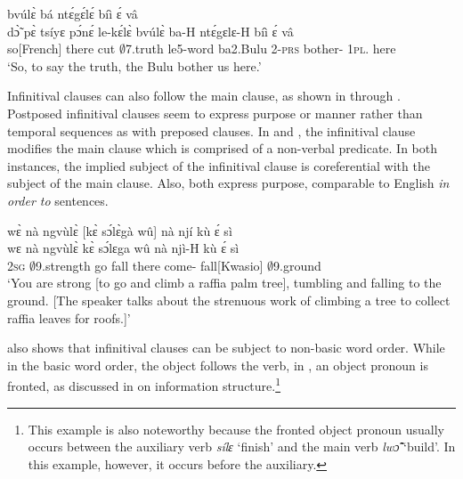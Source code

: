 \ea\label{INFpre6}
  \glll  [dɔ̃̀ pɛ̀ tsíyɛ̀ pɔ́nɛ́ lèkɛ́lɛ̀]\textsubscript{{\SUB}} bvúlɛ̀ bá ntɛ́gɛ́lɛ́ bíì ɛ́ vâ \\
         {\db}dɔ̃̀ pɛ̀ tsíyɛ pɔ́nɛ́ le-kɛ́lɛ̀ bvúlɛ̀ ba-H ntɛ́gɛlɛ-H bíì ɛ́ vâ \\
         {\db}so[French] there cut $\emptyset$7.truth le5-word ba2.Bulu 2-\textsc{prs} bother-{\R} 1\textsc{pl}.{\OBJ} {\LOC} here   \\
    \trans `So, to say the truth, the Bulu bother us here.'
\z



Infinitival clauses can also follow the main clause, as shown in  through . Postposed infinitival clauses seem to express purpose or manner rather than temporal sequences as with preposed clauses. In  and , the infinitival clause modifies the main clause which is comprised of a non-verbal predicate. In both instances, the implied subject of the infinitival clause is coreferential with the subject of the main clause. Also, both express purpose, comparable to English {\itshape in order to} sentences.



\ea\label{INFpost1}
  \glll     wɛ̀ nà ngvùlɛ̀ [kɛ̀ sɔ́lɛ̀gà wû]\textsubscript{{\SUB}} nà njí kù ɛ́ sì\\
            wɛ nà ngvùlɛ̀ {\db}kɛ̀ sɔ́lɛga wû nà njì-H kù ɛ́ sì\\
           2\textsc{sg} {\COM} $\emptyset$9.strength {\db}go fall there {\COM} come-{\R} fall[Kwasio] {\LOC} $\emptyset$9.ground\\
    \trans `You are strong [to go and climb a raffia palm tree], tumbling and falling to the ground. [The speaker talks about the strenuous work of climbing a tree to collect raffia leaves for roofs.]'
\z

 also shows that infinitival clauses can be subject to non-basic word order. While in the basic word order, the object follows the verb, in , an object pronoun is fronted, as discussed in  on information structure.\footnote{This example is also noteworthy because the fronted object pronoun usually occurs between the auxiliary verb {\itshape sílɛ} `finish' and the main verb {\itshape lwɔ̃̂} `build'. In this example, however, it occurs before the auxiliary.}


